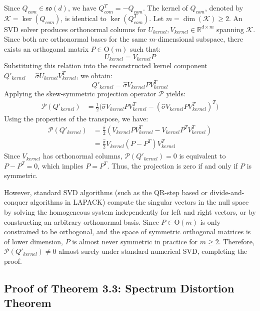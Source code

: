 Since $Q_{com} \in \mathfrak{so}(d)$, we have $Q_{com}^T = -Q_{com}$. The kernel of $Q_{com}$, denoted by $\mathcal{K} = \ker(Q_{com})$, is identical to $\ker(Q_{com}^T)$. Let $m = \dim(\mathcal{K}) \ge 2$.
An SVD solver produces orthonormal columns for $U_{kernel}, V_{kernel} \in \mathbb{R}^{d \times m}$ spanning $\mathcal{K}$. Since both are orthonormal bases for the same $m$-dimensional subspace, there exists an orthogonal matrix $P \in \mathrm{O}(m)$ such that:
\begin{equation*}
U_{kernel} = V_{kernel} P
\end{equation*}
Substituting this relation into the reconstructed kernel component $Q'_{kernel} = \hat{\sigma} U_{kernel} V_{kernel}^T$, we obtain:
\begin{equation*}
Q'_{kernel} = \hat{\sigma} V_{kernel} P V_{kernel}^T
\end{equation*}
Applying the skew-symmetric projection operator $\mathcal{P}$ yields:
\begin{align*}
\mathcal{P}(Q'_{kernel}) &= \frac{1}{2}\Big( \hat{\sigma} V_{kernel} P V_{kernel}^T - \left( \hat{\sigma} V_{kernel} P V_{kernel}^T \right)^T \Big)
\end{align*}
Using the properties of the transpose, we have:
\begin{align*}
\mathcal{P}(Q'_{kernel}) &= \frac{\hat{\sigma}}{2} \left( V_{kernel} P V_{kernel}^T - V_{kernel} P^T V_{kernel}^T \right) \\
&= \frac{\hat{\sigma}}{2} V_{kernel} (P - P^T) V_{kernel}^T
\end{align*}
Since $V_{kernel}$ has orthonormal columns, $\mathcal{P}(Q'_{kernel}) = 0$ is equivalent to $P - P^T = 0$, which implies $P = P^T$. Thus, the projection is zero if and only if $P$ is symmetric.

However, standard SVD algorithms (such as the QR-step based or divide-and-conquer algorithms in LAPACK) compute the singular vectors in the null space by solving the homogeneous system independently for left and right vectors, or by constructing an arbitrary orthonormal basis. Since $P \in \mathrm{O}(m)$ is only constrained to be orthogonal, and the space of symmetric orthogonal matrices is of lower dimension, $P$ is almost never symmetric in practice for $m \ge 2$. Therefore, $\mathcal{P}(Q'_{kernel}) \ne 0$ almost surely under standard numerical SVD, completing the proof.

\subsection{Proof of Theorem 3.3: Spectrum Distortion Theorem}
\label{proof:theorem_distortion_active}

